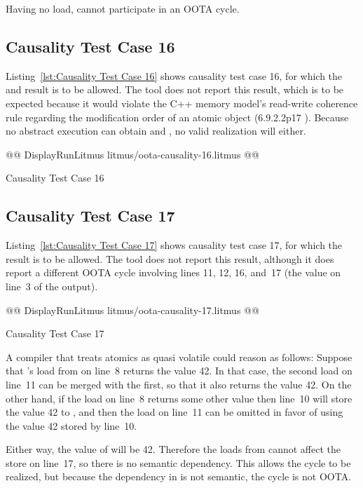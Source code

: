 \documentclass[10]{article}
\begin{document}
Having no load,  cannot participate in an OOTA cycle.

\subsection{Causality Test Case 16}
\label{app:Causality Test Case 16}

Listing~\ref{lst:Causality Test Case 16}
shows causality test case 16, for which the  and 
result is to be allowed.
The  tool does not report this result, which is to be
expected because it would violate the C++ memory model's read-write
coherence rule regarding the modification order of an atomic object
(6.9.2.2p17 ).
Because no abstract execution can obtain  and , no
valid realization will either.

\begin{listing}[tbp]
@@ DisplayRunLitmus litmus/oota-causality-16.litmus @@
\caption{Causality Test Case 16}
\label{lst:Causality Test Case 16}
\end{listing}

\subsection{Causality Test Case 17}
\label{app:Causality Test Case 17}

Listing~\ref{lst:Causality Test Case 17}
shows causality test case 17, for which the 
result is to be allowed.
The  tool does not report this result, although it does
report a different OOTA cycle involving lines 11, 12, 16, and~17
(the  value on line~3 of the  output).

\begin{listing}[tbp]
@@ DisplayRunLitmus litmus/oota-causality-17.litmus @@
\caption{Causality Test Case 17}
\label{lst:Causality Test Case 17}
\end{listing}

A compiler that treats atomics as quasi volatile could reason as follows:
Suppose that 's load from  on line~8 returns the value 42.
In that case, the second load on line~11 can be merged with the first,
so that it also returns the value 42.
On the other hand, if the load on line~8 returns some other value then
line~10 will store the value 42 to , and then the load on line~11
can be omitted in favor of using the value 42 stored by line~10.

Either way, the value of  will be 42.
Therefore the loads from  cannot affect the store on line~17,
so there is no semantic dependency.
This allows the cycle to be realized,
but because the dependency in  is not semantic,
the cycle is not OOTA.
\end{document}
